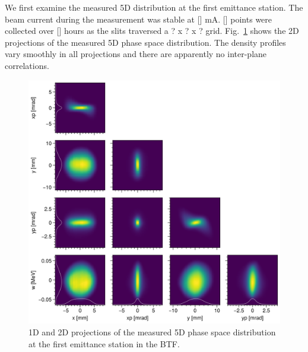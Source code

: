 \documentclass[letterpaper,
               keeplastbox,
               nospread,
               biblatex,
              ]{jacow}
\begin{document}
We first examine the measured 5D distribution at the first emittance station. The beam current during the measurement was stable at [] mA. [] points were collected over [] hours as the slits traversed a ? x ? x ? grid. Fig.~\ref{fig:VS06_corner} shows the 2D projections of the measured 5D phase space distribution. The density profiles vary smoothly in all projections and there are apparently no inter-plane correlations.
%
\begin{figure}[!b]
    \centering
    \includegraphics[width=\columnwidth]{VS06_corner.png}
    \caption{1D and 2D projections of the measured 5D phase space distribution at the first emittance station in the BTF.}
    \label{fig:VS06_corner}
\end{figure}
%
\end{document}

